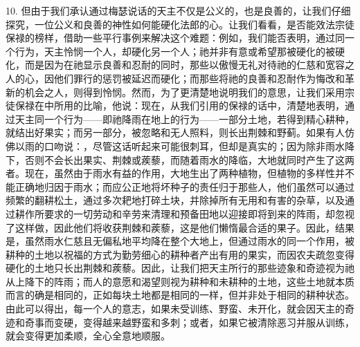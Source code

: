 10. 但由于我们承认通过梅瑟说话的天主不仅是公义的，也是良善的，让我们仔细探究，一位公义和良善的神性如何能硬化法郎的心。让我们看看，是否能效法宗徒保禄的榜样，借助一些平行事例来解决这个难题：例如，我们能否表明，通过同一个行为，天主怜悯一个人，却硬化另一个人；祂并非有意或希望那被硬化的被硬化，而是因为在祂显示良善和忍耐的同时，那些以傲慢无礼对待祂的仁慈和宽容之人的心，因他们罪行的惩罚被延迟而硬化；而那些将祂的良善和忍耐作为悔改和革新的机会之人，则得到怜悯。然而，为了更清楚地说明我们的意思，让我们采用宗徒保禄在中所用的比喻，他说：现在，从我们引用的保禄的话中，清楚地表明，通过天主同一个行为——即祂降雨在地上的行为——一部分土地，若得到精心耕种，就结出好果实；而另一部分，被忽略和无人照料，则长出荆棘和野蓟。如果有人仿佛以雨的口吻说：，尽管这话听起来可能很刺耳，但却是真实的；因为除非雨水降下，否则不会长出果实、荆棘或蒺藜，而随着雨水的降临，大地就同时产生了这两者。现在，虽然由于雨水有益的作用，大地生出了两种植物，但植物的多样性并不能正确地归因于雨水；而应公正地将坏种子的责任归于那些人，他们虽然可以通过频繁的翻耕松土，通过多次耙地打碎土块，并除掉所有无用和有害的杂草，以及通过耕作所要求的一切劳动和辛劳来清理和预备田地以迎接即将到来的阵雨，却忽视了这样做，因此他们将收获荆棘和蒺藜，这是他们懒惰最合适的果子。因此，结果是，虽然雨水仁慈且无偏私地平均降在整个大地上，但通过雨水的同一个作用，被耕种的土地以祝福的方式为勤劳细心的耕种者产出有用的果实，而因农夫疏忽变得硬化的土地只长出荆棘和蒺藜。因此，让我们把天主所行的那些迹象和奇迹视为祂从上降下的阵雨；而人的意愿和渴望则视为耕种和未耕种的土地，这些土地就本质而言的确是相同的，正如每块土地都是相同的一样，但并非处于相同的耕种状态。由此可以得出，每一个人的意志，如果未受训练、野蛮、未开化，就会因天主的奇迹和奇事而变硬，变得越来越野蛮和多刺；或者，如果它被清除恶习并服从训练，就会变得更加柔顺，全心全意地顺服。\par

